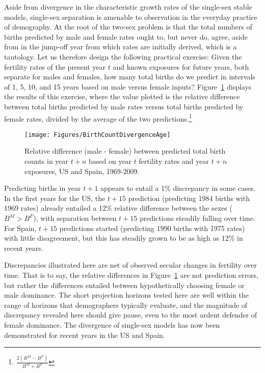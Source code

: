  \FloatBarrier
\label{sec:divbirth}
Aside from divergence in the characteristic growth rates of the single-sex
stable models, single-sex separation is amenable to observation in the everyday
practice of demography. At the root of the two-sex problem is that the total
numbers of births predicted by male and female rates ought to, but never do,
agree, aside from in the jump-off year from which rates are initially derived, 
which is a tautology. Let us therefore design the following practical exercise:
Given the fertility rates of the present year $t$ and known exposures for
future years, both separate for males and females, how many total births do we
predict in intervals of 1, 5, 10, and 15 years based on male
versus female inputs? Figure~\ref{fig:BirthCountDivergenceAge} displays the
results of this exercise, where the value plotted is the relative
difference between total births predicted by male
rates versus total births predicted by female rates, divided by
the average of the two predictions.\footnote{$\frac{2(B^M - B^F)}{B^M + B^F}$}

\begin{figure}[ht!]
        \centering  
          \caption{Relative difference (male - female) between predicted total
          birth counts in year $t+n$ based on year $t$ fertility rates and year $t+n$ exposures, US and Spain, 1969-2009.}
           \texttt{[image: Figures/BirthCountDivergenceAge]}
          \label{fig:BirthCountDivergenceAge}
\end{figure}

Predicting births in year $t+1$ appears to entail a 1\% discrepancy in some
cases. In the first years for the US, the $t+15$ prediction (predicting
1984 births with 1969 rates) already entailed a 12\% relative difference
between the sexes ($B^M > B^F$), with separation between $t+15$ predictions
steadily falling over time. For Spain, $t+15$ predictions started (predicting 1990
births with 1975 rates) with little disagreement, but this has steadily grown to be as high
as 12\% in recent years.

Discrepancies illustrated here are net of observed secular changes in
fertility over time. That is to say, the relative differences in
Figure~\ref{fig:BirthCountDivergenceAge} are not prediction errors, but rather
the differences entailed between hypothetically choosing female or male
dominance. The short projection horizons tested here are well within the range
of horizons that demographers typically evaluate, and the magnitude of
discrepancy revealed here should give pause, even to the most ardent defender
of female dominance. The divergence of single-sex
models has now been demonstrated for recent years in the US and Spain.

